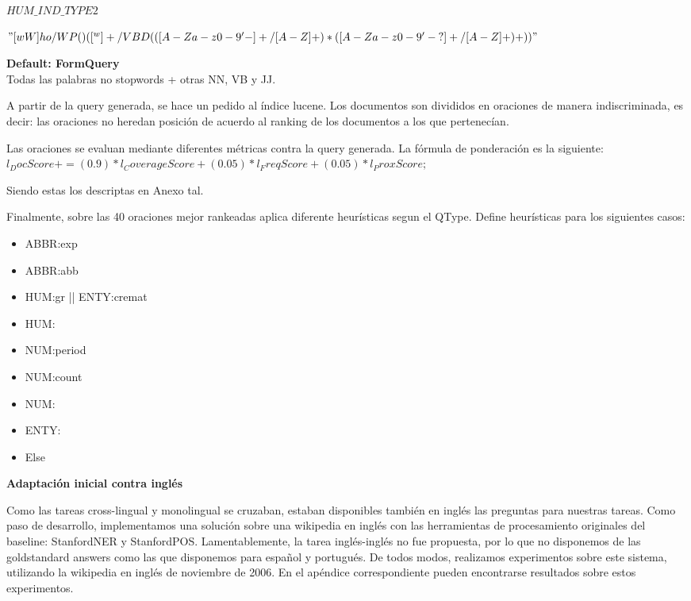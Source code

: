 $HUM\_IND\_TYPE2$

$"[wW]ho/WP( )([^w]+/VBD(([ A-Za-z0-9'\\-]+/[A-Z]+)*([ A-Za-z0-9'\\-\\?]+/[A-Z]+)+))"$

\textbf{Default: FormQuery} \\
Todas las palabras no stopwords + otras NN, VB y JJ. 

A partir de la query generada, se hace un pedido al índice lucene. Los documentos son divididos en oraciones de manera indiscriminada, es decir: las oraciones no heredan posición de acuerdo al ranking de los documentos a los que pertenecían.

Las oraciones se evaluan mediante diferentes métricas contra la query generada. La fórmula de ponderación es la siguiente: \\
$l_DocScore += (0.9)*l_CoverageScore + (0.05)*l_FreqScore+ (0.05)*l_ProxScore;$

Siendo estas los descriptas en Anexo tal.

Finalmente, sobre las 40 oraciones mejor rankeadas aplica diferente heurísticas segun el QType.
Define heurísticas para los siguientes casos:
\begin{itemize}
  \item ABBR:exp
  \item ABBR:abb
	\item HUM:gr || ENTY:cremat
  \item HUM:
  \item NUM:period
  \item NUM:count
  \item NUM:
  \item ENTY:
  \item Else
\end{itemize}

\textbf{Adaptación inicial contra inglés}

Como las tareas cross-lingual y monolingual se cruzaban, estaban disponibles también en inglés las preguntas para nuestras tareas. 
Como paso de desarrollo, implementamos una solución sobre una wikipedia en inglés con las herramientas de procesamiento originales del baseline: StanfordNER y StanfordPOS. Lamentablemente, la tarea inglés-inglés no fue propuesta, por lo que no disponemos de las goldstandard answers como las que disponemos para español y portugués. De todos modos, realizamos experimentos sobre este sistema, utilizando la wikipedia en inglés de noviembre de 2006. En el apéndice correspondiente pueden encontrarse resultados sobre estos experimentos.


